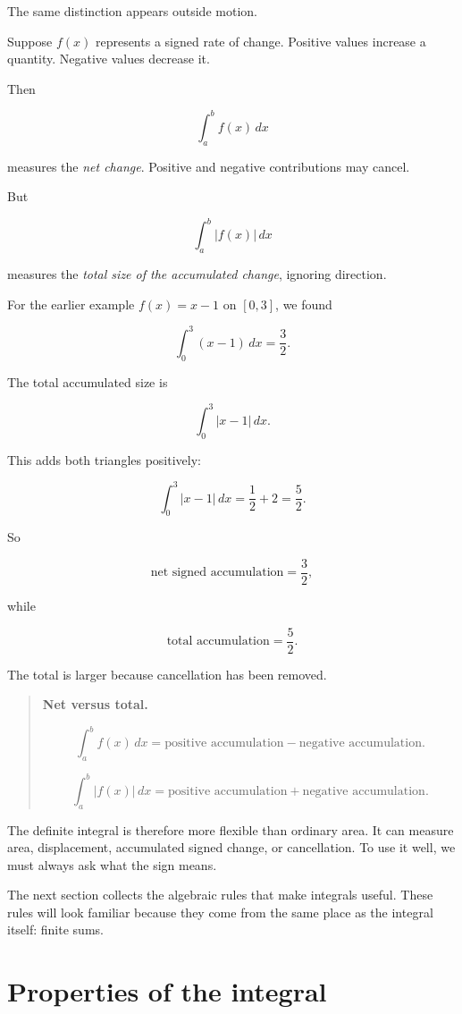 The same distinction appears outside motion.

Suppose \(f(x)\) represents a signed rate of change.  Positive values increase a quantity.
Negative values decrease it.

Then

\[
\int_a^b f(x)\,dx
\]

measures the \emph{net change}.  Positive and negative contributions may cancel.

But

\[
\int_a^b |f(x)|\,dx
\]

measures the \emph{total size of the accumulated change}, ignoring direction.

For the earlier example \(f(x)=x-1\) on \([0,3]\), we found

\[
\int_0^3 (x-1)\,dx=\frac32.
\]

The total accumulated size is

\[
\int_0^3 |x-1|\,dx.
\]

This adds both triangles positively:

\[
\int_0^3 |x-1|\,dx
=
\frac12+2
=
\frac52.
\]

So

\[
\text{net signed accumulation}=\frac32,
\]

while

\[
\text{total accumulation}=\frac52.
\]

The total is larger because cancellation has been removed.

\begin{quote}
\textbf{Net versus total.}

\[
\boxed{
\int_a^b f(x)\,dx
=
\text{positive accumulation}
-
\text{negative accumulation}.
}
\]

\[
\boxed{
\int_a^b |f(x)|\,dx
=
\text{positive accumulation}
+
\text{negative accumulation}.
}
\]
\end{quote}

The definite integral is therefore more flexible than ordinary area.  It can measure area,
displacement, accumulated signed change, or cancellation.  To use it well, we must always
ask what the sign means.

The next section collects the algebraic rules that make integrals useful.  These rules will
look familiar because they come from the same place as the integral itself: finite sums.

\section{Properties of the integral}
\label{sec:properties-of-the-integral}

